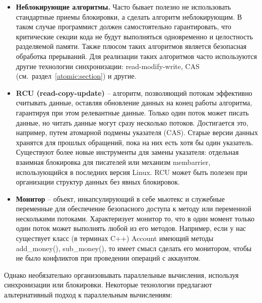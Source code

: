 \begin{itemize}
    \item\textbf{Неблокирующие алгоритмы.} Часто бывает полезно не использовать стандартные приемы блокировки, а сделать алгоритм неблокирующим.
    В таком случае программист должен самостоятельно гарантировать, что критические секции кода не будут выполняться одновременно и целостность разделяемой памяти.
    Также плюсом таких алгоритмов является безопасная обработка прерываний.
    Для реализации таких алгоритмов часто используются другие технологии синхронизации: read-modify-write, CAS (см.\ раздел~\ref{atomic:section}) и другие.
    
    \item\textbf{RCU (read-copy-update)} -- алгоритм, позволяющий потокам эффективно считывать данные, оставляя обновление данных на конец работы алгоритма, гарантируя при этом релевантные данные.
    Только один поток может писать данные, но читать данные могут сразу несколько потоков.
    Достигается это, например, путем атомарной подмены указателя (CAS). Старые версии данных хранятся для прошлых обращений, пока на них есть хотя бы один указатель.
    Существуют более новые инструменты для замены указателя: отдельная взаимная блокировка для писателей или механизм membarrier, использующийся в последних версия Linux.
    RCU может быть полезен при организации структур данных без явных блокировок.
    
    \item\textbf{Монитор} -- объект, инкапсулирующий в себе мьютекс и служебные переменные для обеспечение безопасного доступа к методу или переменной несколькими потоками.
    Характеризует монитор то, что в один момент только один поток может выполнять любой из его методов.
    Например, если у нас существует класс (в терминах C++) Account имеющий методы add\_money(), sub\_money(), то имеет смысл сделать его монитором, чтобы не было конфликтов при проведении операций с аккаунтом.
\end{itemize}

Однако необязательно организовывать параллельные вычисления, используя синхронизации или блокировки.
Некоторые технологии предлагают альтернативный подход к параллельным вычислениям:

